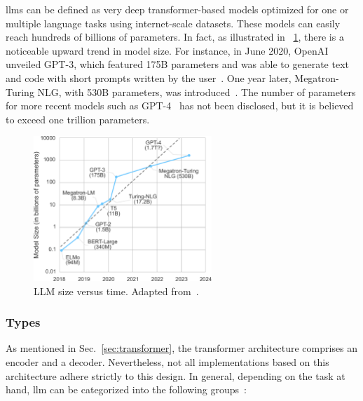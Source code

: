 
\glspl{llm} can be defined as very deep transformer-based models optimized for one or multiple language tasks using internet-scale datasets. These models can easily reach hundreds of billions of parameters. In fact, as illustrated in \fig~\ref{fig:llm_size_trend}, there is a noticeable upward trend in model size. For instance, in June 2020, OpenAI unveiled GPT-3, which featured 175B parameters and was able to generate text and code with short prompts written by the user~\cite{brown2020language,nvidiaWhatLarge}. One year later, Megatron-Turing NLG, with 530B parameters, was introduced~\cite{smith2022using}. The number of parameters for more recent models such as GPT-4~\cite{achiam2023gpt} has not been disclosed, but it is believed to exceed one trillion parameters.


\begin{figure}[!ht]
\begin{center}
\includegraphics[width=0.6\textwidth]{Figures/Background/llm_size_trend.pdf}
\caption{LLM size versus time. Adapted from~\cite{nvidiaUsingDeepSpeed}.}
\label{fig:llm_size_trend}
\end{center}
\end{figure}


\subsubsection{Types}
As mentioned in Sec.~\ref{sec:transformer}, the transformer architecture comprises an encoder and a decoder. Nevertheless, not all implementations based on this architecture adhere strictly to this design. In general, depending on the task at hand, \gls{llm} can be categorized into the following groups~\cite{nvidiaWhatLarge}:

